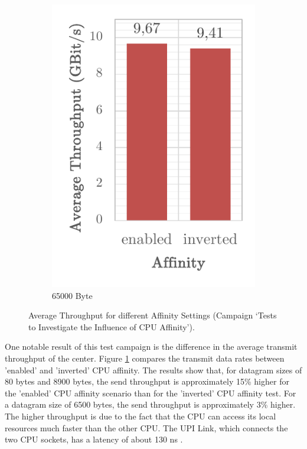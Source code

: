 \begin{figure}[h]
\begin{subfigure}[b]{0.32\textwidth}
        \includegraphics[width=\textwidth]{figures/reliability/ihawk/diagr10c.pdf}
        \caption{65000 Byte}
    \end{subfigure}
    \caption{Average Throughput for different Affinity Settings (Campaign `Tests to Investigate the Influence of CPU Affinity').}
    \label{fig:diagr10Throuhput}
\end{figure}

One notable result of this test campaign is the difference in the average transmit throughput of the center. Figure \ref{fig:diagr10Throuhput} compares the transmit data rates between 'enabled' and 'inverted' CPU affinity. The results show that, for datagram sizes of 80 bytes and 8900 bytes, the send throughput is approximately 15\% higher for the 'enabled' CPU affinity scenario than for the 'inverted' CPU affinity test. For a datagram size of 6500 bytes, the send throughput is approximately 3\% higher. The higher throughput is due to the fact that the CPU can access its local resources much faster than the other CPU. The UPI Link, which connects the two CPU sockets, has a latency of about 130 ns \cite{setup07}.

